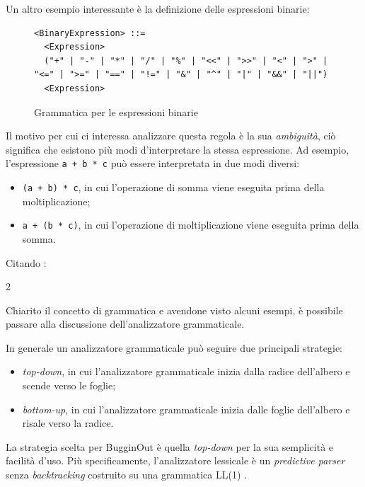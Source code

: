 Un altro esempio interessante \`e la definizione delle espressioni binarie:
\begin{figure}[H]
	\centering
	\begin{verbatim}
<BinaryExpression> ::=
  <Expression>
  ("+" | "-" | "*" | "/" | "%" | "<<" | ">>" | "<" | ">" | "<=" | ">=" | "==" | "!=" | "&" | "^" | "|" | "&&" | "||")
  <Expression>
	\end{verbatim}
	\caption{Grammatica per le espressioni binarie}
	\label{fig:bugginout-binary-expression}
\end{figure}

Il motivo per cui ci interessa analizzare questa regola \`e la sua \emph{ambiguit\`a}, ci\`o significa che esistono pi\`u modi d'interpretare la stessa espressione. Ad esempio, l'espressione \texttt{a + b * c} pu\`o essere interpretata in due modi diversi:
\begin{itemize}
	\item \texttt{(a + b) * c}, in cui l'operazione di somma viene eseguita prima della moltiplicazione;
	\item \texttt{a + (b * c)}, in cui l'operazione di moltiplicazione viene eseguita prima della somma.
\end{itemize}
Citando \cite{alfred2007compilers}:
\begin{parcolumns}[colwidths={1=0.44\textwidth,2=0.44\textwidth},rulebetween=true,nofirstindent=true,sloppy=true]{2}
	\colplacechunks
\end{parcolumns}

Chiarito il concetto di grammatica e avendone visto alcuni esempi, \`e possibile passare alla discussione dell'analizzatore grammaticale.

In generale un analizzatore grammaticale pu\`o seguire due principali strategie:
\begin{itemize}
	\item \emph{top-down}, in cui l'analizzatore grammaticale inizia dalla radice dell'albero e scende verso le foglie;
	\item \emph{bottom-up}, in cui l'analizzatore grammaticale inizia dalle foglie dell'albero e risale verso la radice.
\end{itemize}
La strategia scelta per BugginOut \`e quella \emph{top-down} per la sua semplicit\`a e facilit\`a d'uso. Pi\`u specificamente, l'analizzatore lessicale \`e un \textit{predictive parser} senza \textit{backtracking} costruito su una grammatica LL(1) \cite{alfred2007compilers}.

